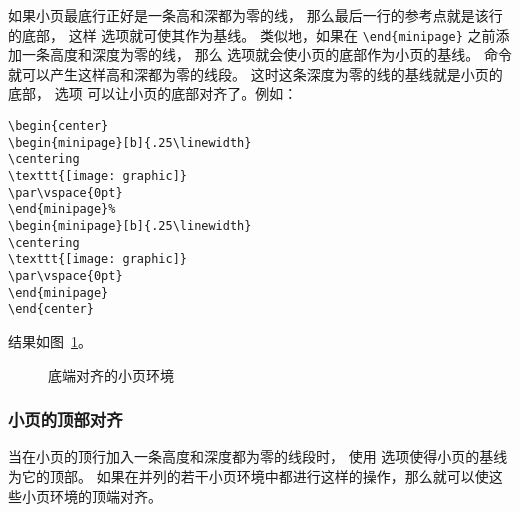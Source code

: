如果小页最底行正好是一条高和深都为零的线，
那么最后一行的参考点就是该行的底部，
这样 \opt{[b]} 选项就可使其作为基线。
类似地，如果在 \verb|\end{minipage}| 之前添加一条高度和深度为零的线，
那么 \opt{[b]} 选项就会使小页的底部作为小页的基线。
命令  就可以产生这样高和深都为零的线段。
这时这条深度为零的线的基线就是小页的底部，
选项 \opt{[b]} 可以让小页的底部对齐了。例如：
\begin{lstlisting}
\begin{center}
\begin{minipage}[b]{.25\linewidth}
\centering
\texttt{[image: graphic]}
\par\vspace{0pt}
\end{minipage}%
\begin{minipage}[b]{.25\linewidth}
\centering
\texttt{[image: graphic]}
\par\vspace{0pt}
\end{minipage}
\end{center}
\end{lstlisting}
结果如图~\ref{fig:minipagesamp-2}。
\begin{figure}
\begin{center}
	\begin{minipage}[b]{.25\linewidth}
		\centering
		\resizebox{1in}{!}{\usebox{\boxgraphic}}
		\par\vspace{0pt}
	\end{minipage}%
	\begin{minipage}[b]{.25\linewidth}
		\centering
		\par\vspace{0pt}
	\end{minipage}
\end{center}
\caption{底端对齐的小页环境}\label{fig:minipagesamp-2}
\end{figure}

\subsubsection{小页的顶部对齐}
当在小页的顶行加入一条高度和深度都为零的线段时，
使用 \opt{[t]} 选项使得小页的基线为它的顶部。
如果在并列的若干小页环境中都进行这样的操作，那么就可以使这些小页环境的顶端对齐。

